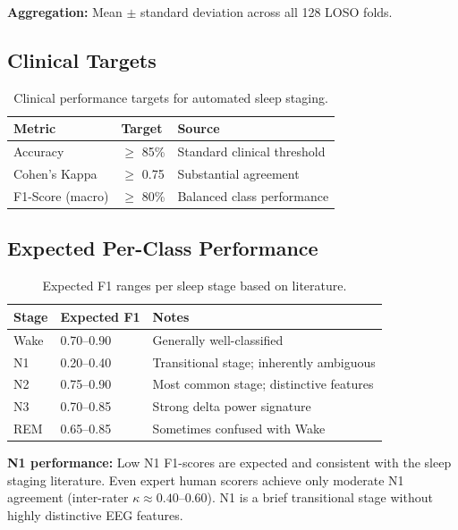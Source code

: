 \textbf{Aggregation:} Mean $\pm$ standard deviation across all 128 LOSO folds.

\subsection{Clinical Targets}

\begin{table}[h]
\centering
\caption{Clinical performance targets for automated sleep staging.}
\label{tab:clinical_targets}
\begin{tabular}{l l l}
\toprule
\textbf{Metric} & \textbf{Target} & \textbf{Source} \\
\midrule
Accuracy         & $\geq$ 85\%  & Standard clinical threshold \\
Cohen's Kappa    & $\geq$ 0.75  & Substantial agreement \\
F1-Score (macro) & $\geq$ 80\%  & Balanced class performance \\
\bottomrule
\end{tabular}
\end{table}

\subsection{Expected Per-Class Performance}

\begin{table}[h]
\centering
\caption{Expected F1 ranges per sleep stage based on literature.}
\label{tab:expected_performance}
\begin{tabular}{l l l}
\toprule
\textbf{Stage} & \textbf{Expected F1} & \textbf{Notes} \\
\midrule
Wake & 0.70--0.90 & Generally well-classified \\
N1   & 0.20--0.40 & Transitional stage; inherently ambiguous \\
N2   & 0.75--0.90 & Most common stage; distinctive features \\
N3   & 0.70--0.85 & Strong delta power signature \\
REM  & 0.65--0.85 & Sometimes confused with Wake \\
\bottomrule
\end{tabular}
\end{table}

\textbf{N1 performance:} Low N1 F1-scores are expected and consistent with the sleep staging literature. Even expert human scorers achieve only moderate N1 agreement (inter-rater $\kappa \approx 0.40$--0.60). N1 is a brief transitional stage without highly distinctive EEG features.

